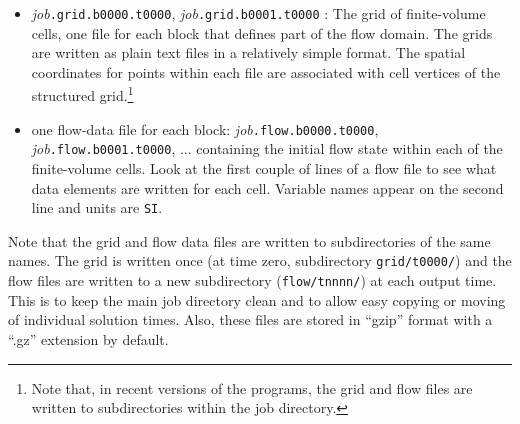 \begin{itemize}
           \item \textit{job}\texttt{.grid.b0000.t0000}, \textit{job}\texttt{.grid.b0001.t0000} :
             The grid of finite-volume cells, 
             one file for each block that defines part of the flow domain.
             The grids are written as plain text files in a relatively simple format.
             The spatial coordinates for points within each file are
             associated with cell vertices of the structured grid.\footnote{Note that, in recent versions of the programs, 
             the grid and flow files are written to subdirectories within the job directory.}
           \item one flow-data file for each block:
             \textit{job}\texttt{.flow.b0000.t0000}, \textit{job}\texttt{.flow.b0001.t0000}, ...
             containing the initial flow state within each of the finite-volume cells.
             Look at the first couple of lines of a flow file to see what data elements are written for each cell.
             Variable names appear on the second line and units are \texttt{SI}.
         \end{itemize}
         Note that the grid and flow data files are written to subdirectories of the same names.
         The grid is written once (at time zero, subdirectory \texttt{grid/t0000/}) and 
         the flow files are written to a new subdirectory (\texttt{flow/tnnnn/}) at each output time.
         This is to keep the main job directory clean and to allow easy copying or moving of 
         individual solution times.
         Also, these files are stored in ``gzip'' format with a ``.gz'' extension by default.

\newpage
